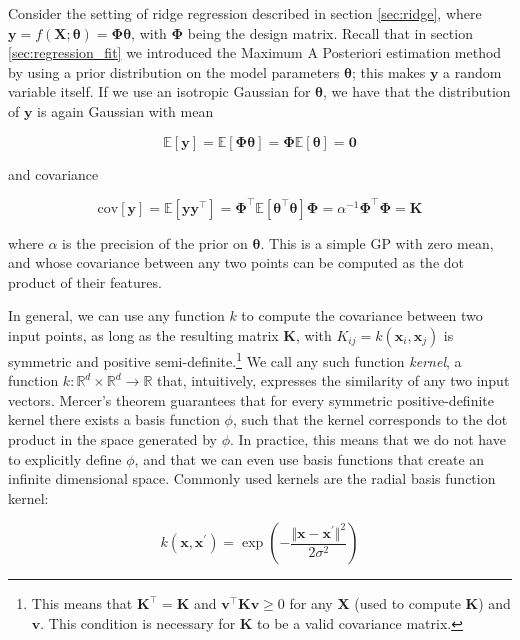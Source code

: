 \documentclass[a4paper,11pt]{kth-mag}
\begin{document}
Consider the setting of ridge regression described in section \ref{sec:ridge}, where $\bm y=f(\bm X;\bm\theta)=\bm\Phi\bm\theta$, with $\bm\Phi$ being the design matrix. Recall that in section \ref{sec:regression_fit} we introduced the Maximum A Posteriori estimation method by using a prior distribution on the model parameters $\bm\theta$; this makes $\bm y$ a random variable itself. If we use an isotropic Gaussian for $\bm\theta$, we have that the distribution of $\bm y$ is again Gaussian with mean

\begin{equation}
\mathbb{E}[\bm y]=\mathbb{E}[\bm\Phi\bm\theta]=\bm\Phi\mathbb{E}[\bm\theta]=\bm 0
\end{equation}

\noindent and covariance

\begin{equation}
\text{cov}[\bm y]=\mathbb{E}[\bm y\bm y^\intercal]
=\bm\Phi^\intercal\mathbb{E}[\bm\theta^\intercal\bm\theta]\bm\Phi
=\alpha^{-1}\bm\Phi^\intercal\bm\Phi=\bm K
\end{equation}

\noindent where $\alpha$ is the precision of the prior on $\bm\theta$. This is a simple GP with zero mean, and whose covariance between any two points can be computed as the dot product of their features.

In general, we can use any function $k$ to compute the covariance between two input points, as long as the resulting matrix $\bm K$, with $K_{ij}=k(\bm x_i,\bm x_j)$ is symmetric and positive semi-definite.\footnote{This means that $\bm K^\intercal=\bm K$ and $\bm v^\intercal\bm K\bm v\geq 0$ for any $\bm X$ (used to compute $\bm K$) and $\bm v$. This condition is necessary for $\bm K$ to be a valid covariance matrix.} We call any such function  \emph{kernel}, a function $k:\mathbb{R}^d\times\mathbb{R}^d\rightarrow\mathbb{R}$ that, intuitively, expresses the similarity of any two input vectors. Mercer's theorem guarantees that for every symmetric positive-definite kernel there exists a basis function $\phi$, such that the kernel corresponds to the dot product in the space generated by $\phi$. In practice, this means that we do not have to explicitly define $\phi$, and that we can even use basis functions that create an infinite dimensional space. Commonly used kernels are the radial basis function kernel:

\begin{equation}
k(\bm x, \bm x^\prime)=\exp\left(-\frac{\Vert\bm x-\bm x^\prime\Vert^2}{2\sigma^2}\right)
\end{equation}
\end{document}
